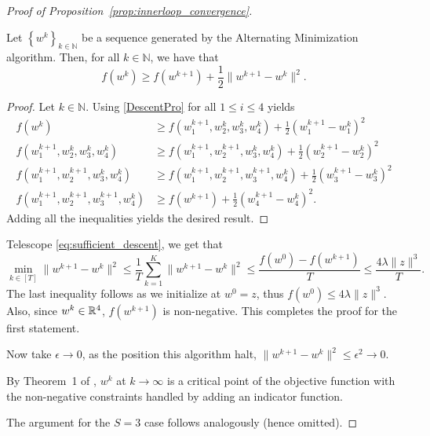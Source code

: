 \begin{proof}[Proof of Proposition~\ref{prop:innerloop_convergence}]
    \begin{proposition}
        Let $\left\{ w^{k} \right\}_{k \in \mathbb{N}}$ be a sequence generated by the Alternating Minimization algorithm. Then, for all $k \in \mathbb{N}$, we have that 
        \begin{equation}\label{eq:sufficient_descent}
            f\left(w^{k}\right) \geq f\left(w^{k + 1}\right) + \frac{1}{2}\| w^{k + 1} - w^{k} \|^{2}.
        \end{equation}
    \end{proposition}
        \begin{proof}
            Let $k \in \mathbb{N}$. Using \eqref{DescentPro} for all $1 \leq i \leq 4$ yields
            \begin{align*}
                f\left(w^{k}\right) &\geq f\left(w_{1}^{k + 1}, w_{2}^{k}, w_{3}^{k}, w_{4}^{k}\right) + \frac{1}{2}(w_{1}^{k + 1} - w_{1}^{k})^2 \\
                f\left(w_{1}^{k + 1}, w_{2}^{k}, w_{3}^{k}, w_{4}^{k}\right) &\geq f\left(w_{1}^{k + 1}, w_{2}^{k + 1}, w_{3}^{k}, w_{4}^{k}\right) + \frac{1}{2}(w_{2}^{k + 1} - w_{2}^{k})^2 \\
                f\left(w_{1}^{k + 1}, w_{2}^{k + 1}, w_{3}^{k}, w_{4}^{k}\right) &\geq f\left(w_{1}^{k + 1}, w_{2}^{k + 1}, w_{3}^{k + 1}, w_{4}^{k}\right) + \frac{1}{2}(w_{3}^{k + 1} - w_{3}^{k})^2 \\
                f\left(w_{1}^{k + 1}, w_{2}^{k + 1}, w_{3}^{k + 1}, w_{4}^{k}\right) &\geq f\left(w^{k + 1}\right) + \frac{1}{2}(w_{4}^{k + 1} - w_{4}^{k})^2.
            \end{align*}
            Adding all the inequalities yields the desired result.
        \end{proof}

Telescope \eqref{eq:sufficient_descent}, we get that 
$$\min_{k\in[T]}\|w^{k+1} - w^k\|^2\leq \frac{1}{T} \sum_{k=1}^K \|w^{k+1} - w^k\|^2 \leq \frac{f(w^0) - f(w^{k+1})}{T} \leq \frac{4\lambda\|z\|^3}{T}.$$ 
The last inequality follows as we initialize at $w^0=z$, thus $f(w^0)\leq 4\lambda \|z\|^3$. Also, since $w^k\in\mathbb{R}^4$,  $f(w^{k+1})$ is non-negative. This completes the proof for the first statement. 

Now take $\epsilon\rightarrow 0$, as the position this algorithm halt, $\|w^{k+1} - w^k\|^2 \leq \epsilon^2 \rightarrow 0$. 

By Theorem~1 of \cite{BST2016}, $w^k$ at $k\rightarrow \infty$ is a critical point of the objective function with the non-negative constraints handled by adding an indicator function.



The argument for the $S=3$ case follows analogously (hence omitted).
\end{proof}

